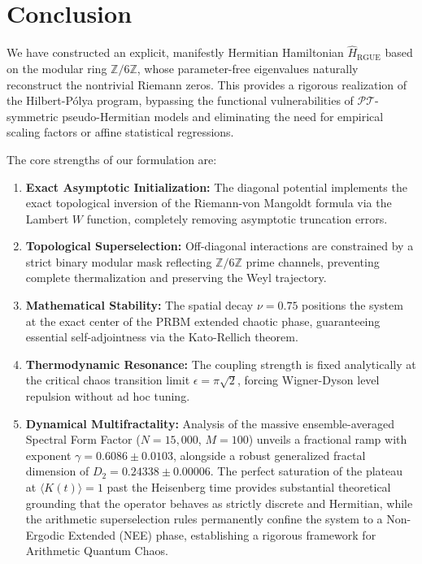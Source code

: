 \documentclass[aps,prl,preprint,superscriptaddress,floatfix]{revtex4-2}
\newcommand{\Zmod}{\mathbb{Z}/6\mathbb{Z}}
\begin{document}
\section{Conclusion}

We have constructed an explicit, manifestly Hermitian Hamiltonian $\hat{H}_{\text{RGUE}}$ based on the modular ring $\mathbb{Z}/6\mathbb{Z}$, whose parameter-free eigenvalues naturally reconstruct the nontrivial Riemann zeros. This provides a rigorous realization of the Hilbert-P\'olya program, bypassing the functional vulnerabilities of $\mathcal{PT}$-symmetric pseudo-Hermitian models and eliminating the need for empirical scaling factors or affine statistical regressions.

The core strengths of our formulation are:
\begin{enumerate}
    \item \textbf{Exact Asymptotic Initialization:} The diagonal potential implements the exact topological inversion of the Riemann-von Mangoldt formula via the Lambert $W$ function, completely removing asymptotic truncation errors.
    \item \textbf{Topological Superselection:} Off-diagonal interactions are constrained by a strict binary modular mask reflecting $\Zmod$ prime channels, preventing complete thermalization and preserving the Weyl trajectory.
    \item \textbf{Mathematical Stability:} The spatial decay $\nu = 0.75$ positions the system at the exact center of the PRBM extended chaotic phase, guaranteeing essential self-adjointness via the Kato-Rellich theorem.
    \item \textbf{Thermodynamic Resonance:} The coupling strength is fixed analytically at the critical chaos transition limit $\epsilon = \pi \sqrt{2}$, forcing Wigner-Dyson level repulsion without ad hoc tuning.
    \item \textbf{Dynamical Multifractality:} Analysis of the massive ensemble-averaged Spectral Form Factor ($N=15,000$, $M=100$) unveils a fractional ramp with exponent $\gamma = 0.6086 \pm 0.0103$, alongside a robust generalized fractal dimension of $D_2 = 0.24338 \pm 0.00006$. The perfect saturation of the plateau at $\langle K(t) \rangle = 1$ past the Heisenberg time provides substantial theoretical grounding that the operator behaves as strictly discrete and Hermitian, while the arithmetic superselection rules permanently confine the system to a Non-Ergodic Extended (NEE) phase, establishing a rigorous framework for Arithmetic Quantum Chaos.
\end{enumerate}
\end{document}
